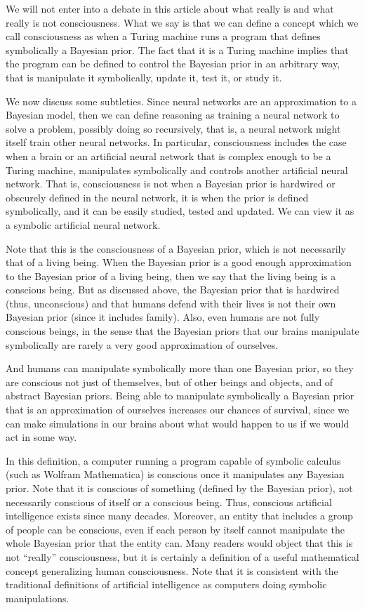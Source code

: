 \documentclass[11pt]{book}
\begin{document}
We will not enter into a debate in this article about what really is and
what really is not consciousness. What we say is that we can define a
concept which we call consciousness as when a Turing machine runs a
program that defines symbolically a Bayesian prior. The fact that it is
a Turing machine implies that the program can be defined to control the
Bayesian prior in an arbitrary way, that is manipulate it symbolically,
update it, test it, or study it.

We now discuss some subtleties. Since neural networks are an
approximation to a Bayesian model, then we can define reasoning as
training a neural network to solve a problem, possibly doing so
recursively, that is, a neural network might itself train other neural
networks. In particular, consciousness includes the case when a brain or
an artificial neural network that is complex enough to be a Turing
machine, manipulates symbolically and controls another artificial neural
network. That is, consciousness is not when a Bayesian prior is
hardwired or obscurely defined in the neural network, it is when the
prior is defined symbolically, and it can be easily studied, tested and
updated. We can view it as a symbolic artificial neural network.

Note that this is the consciousness of a Bayesian prior, which is not
necessarily that of a living being. When the Bayesian prior is a good
enough approximation to the Bayesian prior of a living being, then we
say that the living being is a conscious being. But as discussed above,
the Bayesian prior that is hardwired (thus, unconscious) and that humans
defend with their lives is not their own Bayesian prior (since it
includes family). Also, even humans are not fully conscious beings, in
the sense that the Bayesian priors that our brains manipulate
symbolically are rarely a very good approximation of ourselves.

And humans can manipulate symbolically more than one Bayesian prior, so
they are conscious not just of themselves, but of other beings and
objects, and of abstract Bayesian priors. Being able to manipulate
symbolically a Bayesian prior that is an approximation of ourselves
increases our chances of survival, since we can make simulations in our
brains about what would happen to us if we would act in some way.

In this definition, a computer running a program capable of symbolic
calculus (such as Wolfram Mathematica) is conscious once it manipulates
any Bayesian prior. Note that it is conscious of something (defined by
the Bayesian prior), not necessarily conscious of itself or a conscious
being. Thus, conscious artificial intelligence exists since many
decades. Moreover, an entity that includes a group of people can be
conscious, even if each person by itself cannot manipulate the whole
Bayesian prior that the entity can. Many readers would object that this
is not ``really'' consciousness, but it is certainly a definition of a
useful mathematical concept generalizing human consciousness. Note that
it is consistent with the traditional definitions of artificial
intelligence as computers doing symbolic manipulations.
\end{document}
